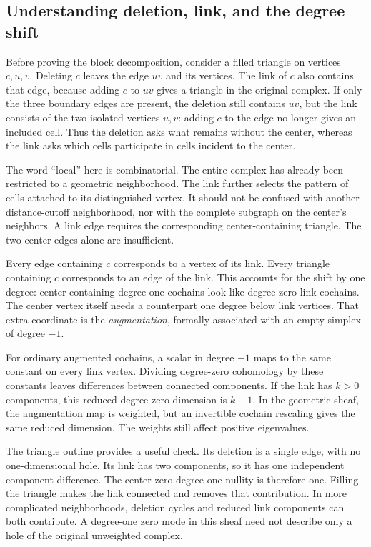 \subsection{Understanding deletion, link, and the degree shift}
Before proving the block decomposition, consider a filled triangle on vertices $c,u,v$. Deleting $c$ leaves the edge $uv$ and its vertices. The link of $c$ also contains that edge, because adding $c$ to $uv$ gives a triangle in the original complex. If only the three boundary edges are present, the deletion still contains $uv$, but the link consists of the two isolated vertices $u,v$: adding $c$ to the edge no longer gives an included cell. Thus the deletion asks what remains without the center, whereas the link asks which cells participate in cells incident to the center.

The word ``local'' here is combinatorial. The entire complex has already been restricted to a geometric neighborhood. The link further selects the pattern of cells attached to its distinguished vertex. It should not be confused with another distance-cutoff neighborhood, nor with the complete subgraph on the center's neighbors. A link edge requires the corresponding center-containing triangle. The two center edges alone are insufficient.

Every edge containing $c$ corresponds to a vertex of its link. Every triangle containing $c$ corresponds to an edge of the link. This accounts for the shift by one degree: center-containing degree-one cochains look like degree-zero link cochains. The center vertex itself needs a counterpart one degree below link vertices. That extra coordinate is the \emph{augmentation}, formally associated with an empty simplex of degree $-1$.

For ordinary augmented cochains, a scalar in degree $-1$ maps to the same constant on every link vertex. Dividing degree-zero cohomology by these constants leaves differences between connected components. If the link has $k>0$ components, this reduced degree-zero dimension is $k-1$. In the geometric sheaf, the augmentation map is weighted, but an invertible cochain rescaling gives the same reduced dimension. The weights still affect positive eigenvalues.

The triangle outline provides a useful check. Its deletion is a single edge, with no one-dimensional hole. Its link has two components, so it has one independent component difference. The center-zero degree-one nullity is therefore one. Filling the triangle makes the link connected and removes that contribution. In more complicated neighborhoods, deletion cycles and reduced link components can both contribute. A degree-one zero mode in this sheaf need not describe only a hole of the original unweighted complex.
